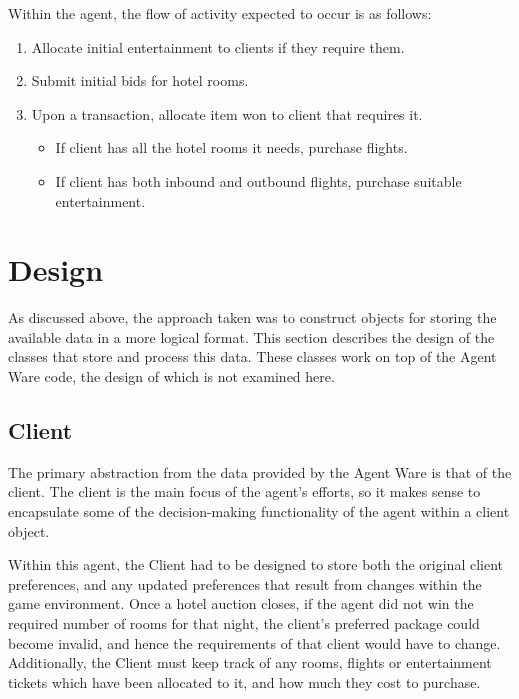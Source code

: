\documentclass{acm_proc_article-sp}
\begin{document}
 Within the agent, the flow of activity expected to occur is as follows:
 \begin{enumerate}
  \item Allocate initial entertainment to clients if they require them.
  \item Submit initial bids for hotel rooms.
  \item Upon a transaction, allocate item won to client that requires it.
   \begin{itemize}
    \item If client has all the hotel rooms it needs, purchase flights.
    \item If client has both inbound and outbound flights, purchase suitable entertainment.
   \end{itemize}
 \end{enumerate}

\section{Design}
 \label{design}

 As discussed above, the approach taken was to construct objects for storing the available data in a more logical format.  This section describes the design of the classes that store and process this data.  These classes work on top of the Agent Ware code, the design of which is not examined here.
 
 \subsection{Client}
  The primary abstraction from the data provided by the Agent Ware is that of the client.  The client is the main focus of the agent's efforts, so it makes sense to encapsulate some of the decision-making functionality of the agent within a client object.
  
  Within this agent, the Client had to be designed to store both the original client preferences, and any updated preferences that result from changes within the game environment.  Once a hotel auction closes, if the agent did not win the required number of rooms for that night, the client's preferred package could become invalid, and hence the requirements of that client would have to change.  Additionally, the Client must keep track of any rooms, flights or entertainment tickets which have been allocated to it, and how much they cost to purchase.
  
\end{document}
